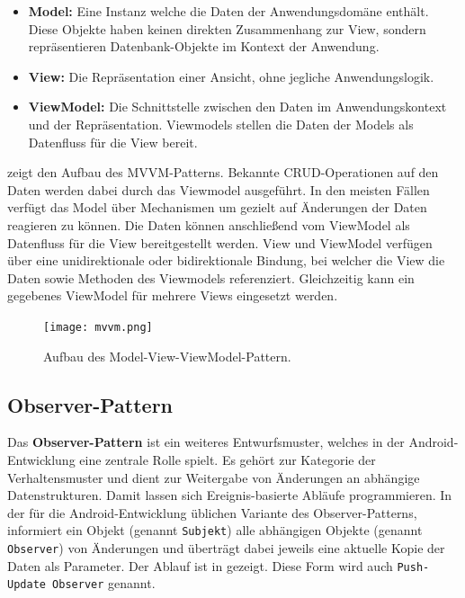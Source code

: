 \begin{itemize}
    \item \textbf{Model:} Eine Instanz welche die Daten der Anwendungsdomäne enthält. Diese Objekte haben keinen direkten Zusammenhang zur View, sondern repräsentieren Datenbank-Objekte im Kontext der Anwendung.
    \item \textbf{View:} Die Repräsentation einer Ansicht, ohne jegliche Anwendungslogik.
    \item \textbf{ViewModel:} Die Schnittstelle zwischen den Daten im Anwendungskontext und der Repräsentation. Viewmodels stellen die Daten der Models als Datenfluss für die View bereit. 
\end{itemize}

 zeigt den Aufbau des MVVM-Patterns. Bekannte CRUD-Operationen auf den Daten werden dabei durch das Viewmodel ausgeführt. In den meisten Fällen verfügt das Model über Mechanismen um gezielt auf Änderungen der Daten reagieren zu können. Die Daten können anschließend vom ViewModel als Datenfluss für die View bereitgestellt werden. View und ViewModel verfügen über eine unidirektionale oder bidirektionale Bindung, bei welcher die View die Daten sowie Methoden des Viewmodels referenziert. Gleichzeitig kann ein gegebenes ViewModel für mehrere Views eingesetzt werden.

\begin{figure}[H]
    \texttt{[image: mvvm.png]}
    \caption{Aufbau des Model-View-ViewModel-Pattern.}\label{fig:mvvm}
\end{figure}

\newpage

\subsection{Observer-Pattern}\label{sub:observer}

Das \textbf{Observer-Pattern} ist ein weiteres Entwurfsmuster, welches in der Android-Entwicklung eine zentrale Rolle spielt. Es gehört zur Kategorie der Verhaltensmuster und dient zur Weitergabe von Änderungen an abhängige Datenstrukturen. Damit lassen sich Ereignis-basierte Abläufe programmieren. In der für die Android-Entwicklung üblichen Variante des Observer-Patterns, informiert ein Objekt (genannt \texttt{Subjekt}) alle  abhängigen Objekte (genannt \texttt{Observer}) von Änderungen und überträgt dabei jeweils eine aktuelle Kopie der Daten als Parameter. Der Ablauf ist in  gezeigt. Diese Form wird auch \texttt{Push-Update Observer} genannt. 

